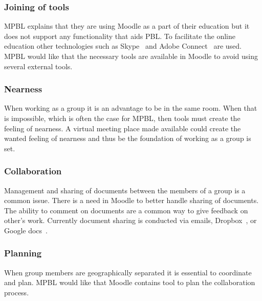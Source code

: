 \subsubsection{Joining of tools} MPBL explains that they are using Moodle as a part of their education but it does not support any functionality that aids PBL. 
To facilitate the online education other technologies such as Skype~\cite{skype} and Adobe Connect~\cite{adobe} are used. 
MPBL would like that the necessary tools are available in Moodle to avoid using several external tools.     

\subsubsection{Nearness} When working as a group it is an advantage to be in the same room.
When that is impossible, which is often the case for MPBL, then tools must create the feeling of nearness. 
A virtual meeting place made available could create the wanted feeling of nearness and thus be the foundation of working as a group is set.

\subsubsection{Collaboration} Management and sharing of documents between the members of a group is a common issue. 
There is a need in Moodle to better handle sharing of documents. 
The ability to comment on documents are a common way to give feedback on other's work. 
Currently document sharing is conducted via emails, Dropbox~\cite{dropbox}, or Google docs~\cite{googledocs}.

\subsubsection{Planning} When group members are geographically separated it is essential to coordinate and plan.
MPBL would like that Moodle contains tool to plan the collaboration process.



\begin{comment}
In the preliminary phase of working with Electronic-learning (E-learning) it is important for us to ensure that we are in fact working with problems that are relevant in the E-learning and Problem Based Learning (PBL) fields of study, as we are aiming at improving the overall way that the chosen E-learning environment at Aalborg University (AAU), namely Moodle, supports PBL. 
Because AAU is renowned for its implementation of PBL, we do not have to look very far to find some of the leading experts in this field.
\end{comment}
\begin{comment}
To optian domain knowlage of how moodle and Aapbl works 
Domain knowlage
In the initial phase of this project we conducted two interviews with xxx from ELSA\cite{x} and yyy from MPBL. 

interviews
*ELSA
*MPBL

*Baseret på de ting de fortalte ->
*Kommunication
* 
*Fildeling

Opdeling i de 4 områder

*akritektur
\end{comment}

